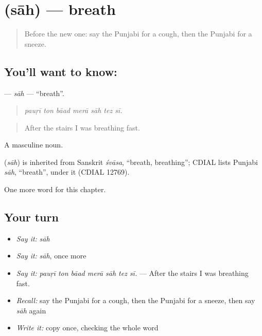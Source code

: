 \section[\texorpdfstring{\pa{ਸਾਹ} (sāh)}{ਸਾਹ (sāh)}]{ (sāh) — breath}

\label{lesson:PA-C321-sah}



\begin{quote}
Before the new one: say the Punjabi for a cough, then the Punjabi for a sneeze.
\end{quote}

\subsection*{You'll want to know: }
\textbf{} — \emph{sāh} — \textquotedblleft{}breath\textquotedblright{}.

\begin{quote}
      
\end{quote}

\begin{quote}
\emph{pauṛī ton bāad merā sāh tez sī.}
\end{quote}

\begin{quote}
After the stairs I was breathing fast.
\end{quote}

A masculine noun.

\begin{cousinweb}
\textbf{} (\emph{sāh}) is inherited from Sanskrit \emph{śvāsa}, \textquotedblleft{}breath, breathing\textquotedblright{}; CDIAL lists Punjabi \emph{sāh}, \textquotedblleft{}breath\textquotedblright{}, under it (CDIAL 12769).
\end{cousinweb}

\begin{grammarlens}[title={What you've built}]
One more word for this chapter.
\end{grammarlens}

\subsection*{Your turn}
\begin{itemize}
\raggedright
  \item \emph{Say it:} \emph{sāh}
  \item \emph{Say it:} \emph{sāh}, once more
  \item \emph{Say it:} \emph{pauṛī ton bāad merā sāh tez sī.} — After the stairs I was breathing fast.
  \item \emph{Recall:} say the Punjabi for a cough, then the Punjabi for a sneeze, then say \emph{sāh} again
  \item \emph{Write it:} copy \textbf{} once, checking the whole word
\end{itemize}

